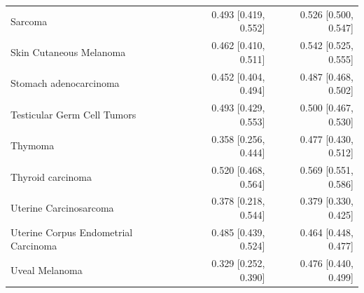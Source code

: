 \begin{tabularx}{\textwidth}{@{}Yrr@{}}
Sarcoma & 0.493 [0.419, 0.552] & 0.526 [0.500, 0.547] \\
Skin Cutaneous Melanoma & 0.462 [0.410, 0.511] & 0.542 [0.525, 0.555] \\
Stomach adenocarcinoma & 0.452 [0.404, 0.494] & 0.487 [0.468, 0.502] \\
Testicular Germ Cell Tumors & 0.493 [0.429, 0.553] & 0.500 [0.467, 0.530] \\
Thymoma & 0.358 [0.256, 0.444] & 0.477 [0.430, 0.512] \\
Thyroid carcinoma & 0.520 [0.468, 0.564] & 0.569 [0.551, 0.586] \\
Uterine Carcinosarcoma & 0.378 [0.218, 0.544] & 0.379 [0.330, 0.425] \\
Uterine Corpus Endometrial Carcinoma & 0.485 [0.439, 0.524] & 0.464 [0.448, 0.477] \\
Uveal Melanoma & 0.329 [0.252, 0.390] & 0.476 [0.440, 0.499] \\
\bottomrule
\end{tabularx}
